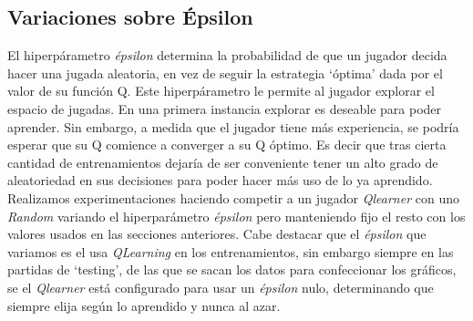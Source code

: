 \documentclass[10pt,a4paper]{article}
\begin{document}
\subsection{Variaciones sobre Épsilon}

El hiperpárametro \emph{épsilon} determina la probabilidad de que un jugador decida hacer una jugada aleatoria, en vez de seguir la estrategia `óptima' dada por el valor de su función Q. Este hiperpárametro le permite al jugador explorar el espacio de jugadas. En una primera instancia explorar es deseable para poder aprender. Sin embargo, a medida que el jugador tiene más experiencia, se podría esperar que su Q comience a converger a su Q óptimo. Es decir que tras cierta cantidad de entrenamientos dejaría de ser conveniente tener un alto grado de aleatoriedad en sus decisiones para poder hacer más uso de lo ya aprendido. Realizamos experimentaciones haciendo competir a un jugador \textit{Qlearner} con uno \textit{Random} variando el hiperparámetro \textit{épsilon} pero manteniendo fijo el resto con los valores usados en las secciones anteriores. Cabe destacar que el \emph{épsilon} que variamos es el usa \emph{QLearning} en los entrenamientos, sin embargo siempre en las partidas de `testing', de las que se sacan los datos para confeccionar los gráficos, se el \emph{Qlearner} está configurado para usar un \emph{épsilon} nulo, determinando que siempre elija según lo aprendido y nunca al azar.\\
\end{document}
